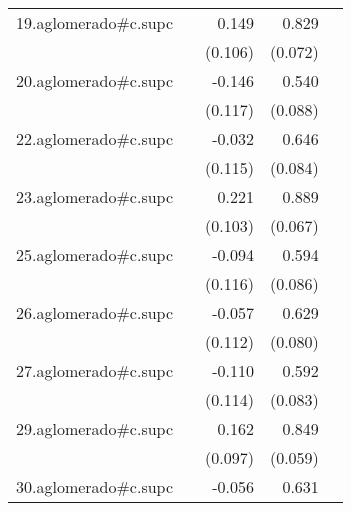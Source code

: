 {\begin{longtable}{l*{4}{D{.}{.}{-1}}}
\addlinespace
19.aglomerado#c.supc&                     &       0.149         &       0.829\sym{***}&                     \\
            &                     &     (0.106)         &     (0.072)         &                     \\
\addlinespace
20.aglomerado#c.supc&                     &      -0.146         &       0.540\sym{***}&                     \\
            &                     &     (0.117)         &     (0.088)         &                     \\
\addlinespace
22.aglomerado#c.supc&                     &      -0.032         &       0.646\sym{***}&                     \\
            &                     &     (0.115)         &     (0.084)         &                     \\
\addlinespace
23.aglomerado#c.supc&                     &       0.221\sym{*}  &       0.889\sym{***}&                     \\
            &                     &     (0.103)         &     (0.067)         &                     \\
\addlinespace
25.aglomerado#c.supc&                     &      -0.094         &       0.594\sym{***}&                     \\
            &                     &     (0.116)         &     (0.086)         &                     \\
\addlinespace
26.aglomerado#c.supc&                     &      -0.057         &       0.629\sym{***}&                     \\
            &                     &     (0.112)         &     (0.080)         &                     \\
\addlinespace
27.aglomerado#c.supc&                     &      -0.110         &       0.592\sym{***}&                     \\
            &                     &     (0.114)         &     (0.083)         &                     \\
\addlinespace
29.aglomerado#c.supc&                     &       0.162         &       0.849\sym{***}&                     \\
            &                     &     (0.097)         &     (0.059)         &                     \\
\addlinespace
30.aglomerado#c.supc&                     &      -0.056         &       0.631\sym{***}&                     \\

\end{longtable}}
